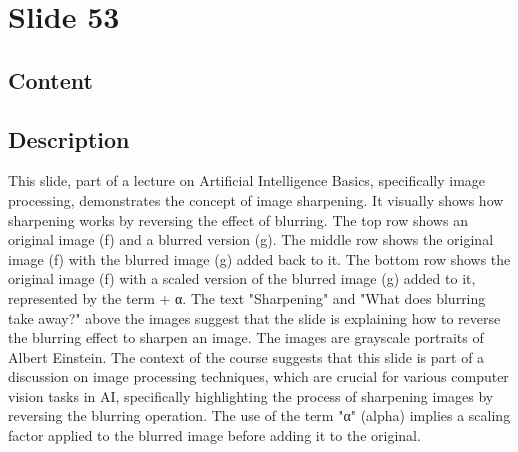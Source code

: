 \documentclass{article}%
\begin{document}
%
\newpage%
\section{Slide 53}%
\label{sec:Slide53}%
\subsection{Content}%
%
\subsection{Description}%
This slide, part of a lecture on Artificial Intelligence Basics, specifically image processing, demonstrates the concept of image sharpening.  It visually shows how sharpening works by reversing the effect of blurring.  The top row shows an original image (f) and a blurred version (g).  The middle row shows the original image (f) with the blurred image (g) added back to it. The bottom row shows the original image (f) with a scaled version of the blurred image (g) added to it, represented by the term + α.  The text "Sharpening" and "What does blurring take away?" above the images suggest that the slide is explaining how to reverse the blurring effect to sharpen an image. The images are grayscale portraits of Albert Einstein. The context of the course suggests that this slide is part of a discussion on image processing techniques, which are crucial for various computer vision tasks in AI, specifically highlighting the process of sharpening images by reversing the blurring operation. The use of the term "α" (alpha) implies a scaling factor applied to the blurred image before adding it to the original.%
\end{document}
